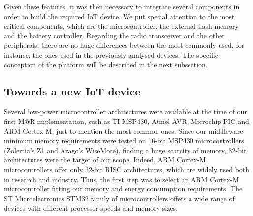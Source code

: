 Given these features, it was then necessary to integrate several components in order to build the required IoT device.
We put special attention to the most critical components, which are the microcontroller, the external flash memory and the battery controller.
Regarding the radio transceiver and the other peripherals, there are no huge differences between the most commonly used, for instance, the ones used in the previously analysed devices.
The specific conception of the platform will be described in the next subsection.

\subsection{Towards a new IoT device}
\label{subsec:newIoTDevice}
Several low-power microcontroller architectures were available at the time of our first M@R implementation, such as TI MSP430, Atmel AVR, Microchip PIC and ARM Cortex-M, just to mention the most common ones.
Since our middleware minimum memory requirements were tested on 16-bit MSP430 microcontrollers (Zolertia's Z1 and Arago's WiseMote), finding a huge scarcity of memory, 32-bit architectures were the target of our scope.
Indeed, ARM Cortex-M microcontrollers offer only 32-bit RISC architectures, which are widely used both in research and industry.
Thus, the first step was to select an ARM Cortex-M microcontroller fitting our memory and energy consumption requirements.
The ST Microelectronics STM32 family of microcontrollers offers a wide range of devices with different processor speeds and memory sizes.


